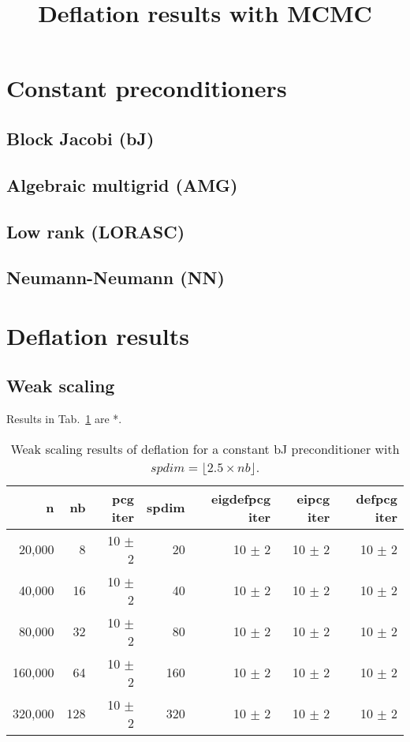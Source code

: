 \documentclass{article}
\title{Deflation results with MCMC}
\begin{document}
\maketitle

\section{Constant preconditioners}

\subsection{Block Jacobi (bJ)}

\subsection{Algebraic multigrid (AMG)}

\subsection{Low rank (LORASC)}


\subsection{Neumann-Neumann (NN)}

\section{Deflation results}

\subsection{Weak scaling}
Results in Tab.~\ref{Tab:005} are *.


\begin{table}[ht]
	\caption{Weak scaling results of deflation for a constant bJ preconditioner with $spdim=\lfloor 2.5 \times nb\rfloor$.}
	\centering
	\begin{tabular}{|r|r|r|r|r|r|r|}
		\hline
		n & nb & pcg iter & spdim & eigdefpcg iter & eipcg iter & defpcg iter\\
		\hline
		20,000  &   8 & 10 $\pm$ 2 & 20 & 10 $\pm$ 2 & 10 $\pm$ 2 & 10 $\pm$ 2 \\
		40,000  &  16 & 10 $\pm$ 2 & 40 & 10 $\pm$ 2 & 10 $\pm$ 2 & 10 $\pm$ 2 \\
		80,000  &  32 & 10 $\pm$ 2 & 80 & 10 $\pm$ 2 & 10 $\pm$ 2 & 10 $\pm$ 2 \\
		160,000 &  64 & 10 $\pm$ 2 & 160 & 10 $\pm$ 2 & 10 $\pm$ 2 & 10 $\pm$ 2 \\
		320,000 & 128 & 10 $\pm$ 2 & 320 & 10 $\pm$ 2 & 10 $\pm$ 2 & 10 $\pm$ 2 \\
		\hline
	\end{tabular}
	\label{Tab:005}
\end{table}
\end{document}
